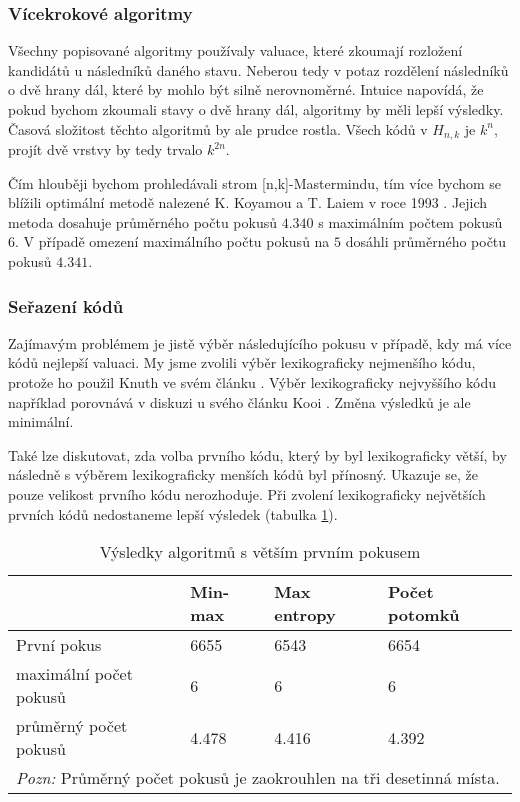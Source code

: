 \subsubsection{Vícekrokové algoritmy}
Všechny popisované algoritmy používaly valuace, které zkoumají rozložení kandidátů u následníků daného stavu. 
Neberou tedy v potaz rozdělení následníků o dvě hrany dál, které by mohlo být silně nerovnoměrné. Intuice napovídá, že pokud bychom zkoumali stavy o dvě hrany dál, algoritmy by měli lepší výsledky. Časová složitost těchto algoritmů by ale prudce rostla. Všech kódů v $H_{n,k}$ je $k^n$, projít dvě vrstvy by tedy trvalo $k^{2n}$. 

Čím hlouběji bychom prohledávali strom [n,k]-Mastermindu, tím více bychom se blížili optimální metodě nalezené K. Koyamou a T. Laiem v roce 1993 \cite{koyama}. Jejich metoda dosahuje průměrného počtu pokusů $4.340$ s maximálním počtem pokusů $6$. V případě omezení maximálního počtu pokusů na $5$ dosáhli průměrného počtu pokusů $4.341$. 


\subsubsection{Seřazení kódů}
Zajímavým problémem je jistě výběr následujícího pokusu v případě, kdy má více kódů nejlepší valuaci. My jsme zvolili výběr lexikograficky nejmenšího kódu, protože ho použil Knuth ve svém článku \cite{donald_e__knuth_1977}. Výběr lexikograficky nejvyššího kódu například porovnává v diskuzi u svého článku Kooi \cite{kooi}. Změna výsledků je ale minimální. 

Také lze diskutovat, zda volba prvního kódu, který by byl lexikograficky větší, by následně s výběrem lexikograficky menších kódů byl přínosný. Ukazuje se, že pouze velikost prvního kódu nerozhoduje. Při zvolení lexikograficky největších prvních kódů nedostaneme lepší výsledek (tabulka \ref{tabvysokyprvnipokus}).


\begin{table}[h]
\centering
\begin{tabular}{l l l l}
\toprule
 & Min-max & Max entropy & Počet potomků  \\
\midrule

První pokus 
& 6655 & 6543 & 6654  \\


maximální počet pokusů 
& 6 & 6 & 6  \\

průměrný počet pokusů 
& 4.478 & 4.416 & 4.392 \\
\bottomrule
\multicolumn{4}{l}{\footnotesize \textit{Pozn:}
Průměrný počet pokusů je zaokrouhlen na tři desetinná místa.}
\end{tabular}
\caption{Výsledky algoritmů s větším prvním pokusem}\label{tabvysokyprvnipokus}
\end{table}







